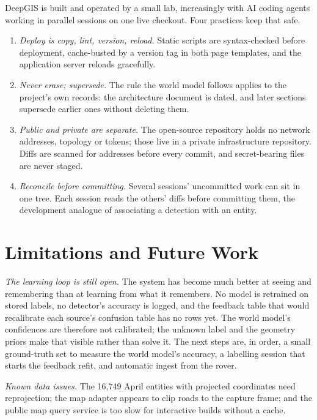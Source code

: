 \documentclass[journal]{IEEEtran}
\begin{document}
DeepGIS is built and operated by a small lab, increasingly with AI coding agents working in
parallel sessions on one live checkout. Four practices keep that safe.
\begin{enumerate}
\item \emph{Deploy is copy, lint, version, reload.} Static scripts are syntax-checked before
deployment, cache-busted by a version tag in both page templates, and the application server
reloads gracefully.
\item \emph{Never erase; supersede.} The rule the world model follows applies to the project's own
records: the architecture document is dated, and later sections supersede earlier ones without
deleting them.
\item \emph{Public and private are separate.} The open-source repository holds no network
addresses, topology or tokens; those live in a private infrastructure repository. Diffs are scanned
for addresses before every commit, and secret-bearing files are never staged.
\item \emph{Reconcile before committing.} Several sessions' uncommitted work can sit in one tree.
Each session reads the others' diffs before committing them, the development analogue of
associating a detection with an entity.
\end{enumerate}

\section{Limitations and Future Work}
\label{sec:limits}

\emph{The learning loop is still open.} The system has become much better at seeing and remembering
than at learning from what it remembers. No model is retrained on stored labels, no detector's
accuracy is logged, and the feedback table that would recalibrate each source's confusion table
has no rows yet. The world model's confidences are therefore not calibrated; the unknown label and
the geometry priors make that visible rather than solve it. The next steps are, in order, a small
ground-truth set to measure the world model's accuracy, a labelling session that starts the
feedback refit, and automatic ingest from the rover.

\emph{Known data issues.} The 16{,}749 April entities with projected coordinates need reprojection;
the map adapter appears to clip roads to the capture frame; and the public map query service is too
slow for interactive builds without a cache.
\end{document}
